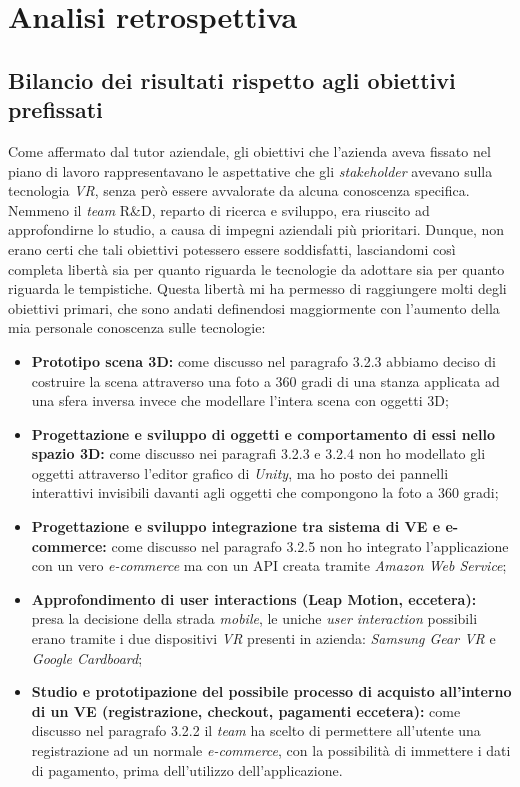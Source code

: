 \newpage
\chapter{Analisi retrospettiva}
\label{cap:analisiretrospettiva}

\section{Bilancio dei risultati rispetto agli obiettivi prefissati}

Come affermato dal tutor aziendale, gli obiettivi che l'azienda aveva fissato nel piano di lavoro rappresentavano le aspettative che gli \textit{stakeholder}\hyperlink{sh}{} avevano sulla tecnologia \textit{VR}, senza però essere avvalorate da alcuna conoscenza specifica. Nemmeno il \textit{team} R\&D, reparto di ricerca e sviluppo, era riuscito ad approfondirne lo studio, a causa di impegni aziendali più prioritari. Dunque, non erano certi che tali obiettivi potessero essere soddisfatti, lasciandomi così completa libertà sia per quanto riguarda le tecnologie da adottare sia per quanto riguarda le tempistiche. Questa libertà mi ha permesso di raggiungere molti degli obiettivi primari, che sono andati definendosi maggiormente con l'aumento della mia personale conoscenza sulle tecnologie:
\begin{itemize}
	\item \textbf{Prototipo scena 3D:} come discusso nel paragrafo 3.2.3 abbiamo deciso di costruire la scena attraverso una foto a 360 gradi di una stanza applicata ad una sfera inversa invece che modellare l'intera scena con oggetti 3D;
	\item \textbf{Progettazione e sviluppo di oggetti e comportamento di essi nello spazio 3D:} come discusso nei paragrafi 3.2.3 e 3.2.4 non ho modellato gli oggetti attraverso l'editor grafico di \textit{Unity}, ma ho posto dei pannelli interattivi invisibili davanti agli oggetti che compongono la foto a 360 gradi;
	\item \textbf{Progettazione e sviluppo integrazione tra sistema di VE e e-commerce:} come discusso nel paragrafo 3.2.5 non ho integrato l'applicazione con un vero \textit{e-commerce} ma con un API creata tramite \textit{Amazon Web Service};
	\item \textbf{Approfondimento di user interactions (Leap Motion, eccetera):} presa la decisione della strada \textit{mobile}, le uniche \textit{user interaction} possibili erano tramite i due dispositivi \textit{VR} presenti in azienda: \textit{Samsung Gear VR} e \textit{Google Cardboard};
	\item \textbf{Studio e prototipazione del possibile processo di acquisto all’interno di un VE (registrazione, checkout, pagamenti eccetera):} come discusso nel paragrafo 3.2.2 il \textit{team} ha scelto di permettere all'utente una registrazione ad un normale \textit{e-commerce}, con la possibilità di immettere i dati di pagamento, prima dell'utilizzo dell'applicazione.
\end{itemize} 

